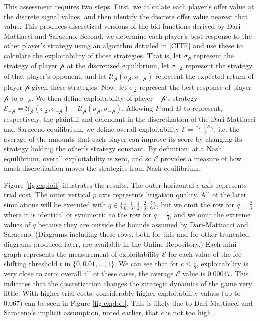 \documentclass{article}
\begin{document}
This assessment requires two steps. First, we calculate each player's offer value at the discrete signal values, and then identify the discrete offer value nearest that value. This produces discretized versions of the bid functions derived by Dari-Mattiacci and Saraceno. Second, we determine each player's best response to the other player's strategy using an algorithm detailed in [CITE] and use these to calculate the exploitability of those strategies. That is, let $\sigma_{\mathcal{p}}$ represent the strategy of player $\mathcal{p}$ at the discretized equilibrium, let $\sigma_{-\mathcal{p}}$ represent the strategy of that player's opponent, and let $\mathcal{U}_{\mathcal{p}}(\sigma_{\mathcal{p}}, \sigma_{-\mathcal{p}})$ represent the expected return of player $\mathcal{p}$ given these strategies. Now, let $\sigma_{\overline{\mathcal{p}}}$ represent the best response of player $\mathcal{p}$ to $\sigma_{-\mathcal{p}}$. We then define exploitability of player $-\mathcal{p}$'s strategy $\mathcal{E}_{-\mathcal{p}} = \mathcal{U}_{\mathcal{p}}(\sigma_{\mathcal{\overline{p}}}, \sigma_{-\mathcal{p}}) - \mathcal{U}_{\mathcal{p}}(\sigma_{\mathcal{p}}, \sigma_{-\mathcal{p}})$. Allowing $P$ and $D$ to represent, respectively, the plaintiff and defendant in the discretization of the Dari-Mattiacci and Saraceno equilibrium, we define overall exploitability $\mathcal{E} = \frac{\mathcal{E}_P + \mathcal{E}_D}{2}$, i.e. the average of the amounts that each player can improve its score by changing its strategy holding the other's strategy constant. By definition, at a Nash equilibrium, overall exploitability is zero, and so $\mathcal{E}$ provides a measure of how much discretization moves the strategies from Nash equilibrium. 

Figure \ref{fig:exploit} illustrates the results. The outer horizontal $c$ axis represents trial cost. The outer vertical $p$ axis represents litigation quality. All of the later simulations will be executed with $q \in \{ \frac{1}{6}, \frac{1}{3}, \frac{1}{2}, \frac{2}{3}, \frac{5}{6} \}$, but we omit the row for $q = \frac{2}{3}$ where it is identical or symmetric to the row for $q = \frac{1}{3}$, and we omit the extreme values of $q$ because they are outside the bounds assumed by Dari-Mattiacci and Saraceno. (Diagrams including these rows, both for this and for other truncated diagrams produced later, are available in the Online Repository.) Each mini-graph represents the measurement of exploitability $\mathcal{E}$ for each value of the fee-shifting threshold $t$ in $\{0, 0.01, ... , 1\}$. We can see that for $c \leq \frac{1}{8}$, exploitability is very close to zero; overall all of these cases, the average $\mathcal{E}$ value is 0.00047. This indicates that the discretization changes the strategic dynamics of the game very little. With higher trial costs, considerably higher exploitability values (up to 0.067) can be seen in Figure \ref{fig:exploit}. This is likely due to Dari-Mattiacci and Saraceno's implicit assumption, noted earlier, that $c$ is not too high.
\end{document}
